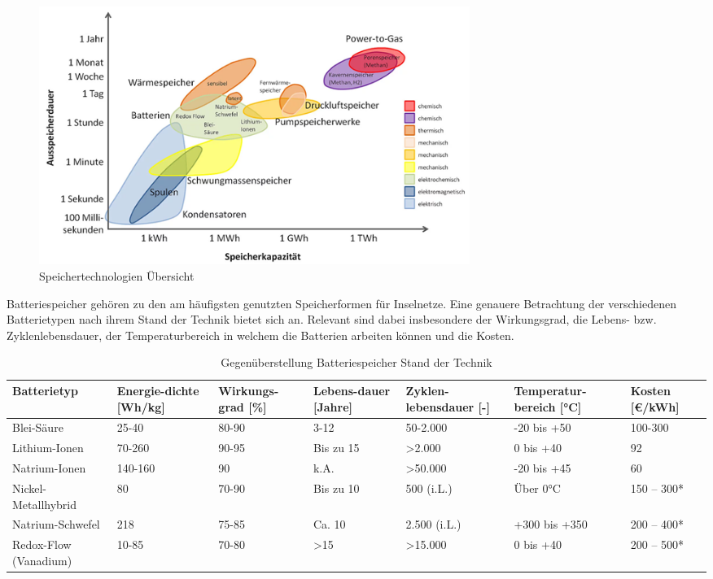 \begin{figure}[h!]
    \centering
    \includegraphics[width=14cm]{Abbildungen/StandDerTechnikAbb3.png}
    \caption{Speichertechnologien Übersicht\cite{eespeicher}}\label{fig:Speichertechnologien_Übersicht}
\end{figure}
 
Batteriespeicher gehören zu den am häufigsten genutzten Speicherformen für Inselnetze. 
Eine genauere Betrachtung der verschiedenen Batterietypen nach ihrem Stand der Technik bietet sich an. 
Relevant sind dabei insbesondere der Wirkungsgrad, die Lebens- bzw. Zyklenlebensdauer, 
der Temperaturbereich in welchem die Batterien arbeiten können und die Kosten.

\begin{table}  
    \centering
    \caption{Gegenüberstellung Batteriespeicher Stand der Technik}
    \label{tab:Gegenüberstellung_Batteriespeicher_Stand_der_Technik}
    \begin{tabular}{p{1.9cm}|p{1.4cm}|p{1.6cm}|p{1.4cm}|p{1.9cm}|p{1.9cm}|p{1.4cm}|}
        \textbf{Batterietyp} & \textbf{Energie-dichte [Wh/kg]} & \textbf{Wirkungs-grad [\%]} & \textbf{Lebens-dauer [Jahre]} & \textbf{Zyklen-lebensdauer [-]} & \textbf{Temperatur-bereich [°C]} & \textbf{Kosten [€/kWh]} \\
            \hline
        Blei-Säure & 25-40 & 80-90 & 3-12 & 50-2.000 & -20 bis +50 & 100-300 \\
            \hline
        Lithium-Ionen & 70-260 & 90-95 & Bis zu 15 & >2.000 & 0 bis +40 & 92 \\
            \hline
        Natrium-Ionen & 140-160 & 90 & k.A. & >50.000 & -20 bis +45 & 60\cite{energieexperten} \\
            \hline
        Nickel-Metallhybrid & 80 & 70-90 & Bis zu 10 & 500 (i.L.) & Über 0°C & 150 – 300* \\
            \hline
        Natrium-Schwefel & 218 & 75-85 & Ca. 10 & 2.500 (i.L.) & +300 bis +350 & 200 – 400* \\
            \hline
        Redox-Flow (Vanadium) & 10-85 & 70-80 & >15 & >15.000 & 0 bis +40 & 200 – 500* \\
    \end{tabular}
\end{table}

